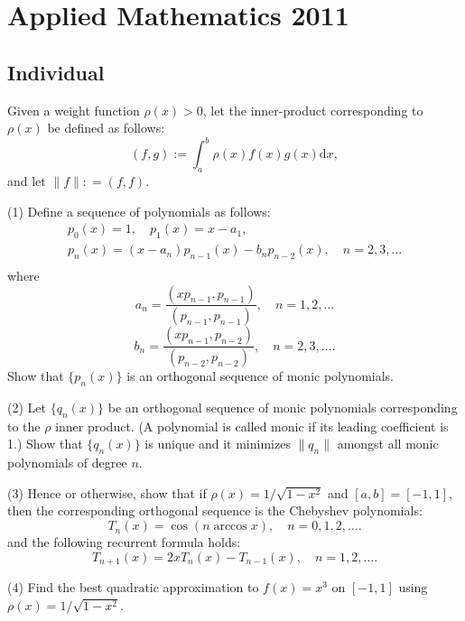 \section{Applied Mathematics 2011}

\subsection{Individual}

\begin{exercise}
\label{applied:2011:1}
Given a weight function $\rho ( x ) > 0$, let the inner-product corresponding to $\rho ( x )$ be defined as follows:
\[
(f, g) := \int_ {a} ^ {b} \rho (x) f (x) g (x) \mathrm {d} x,
\]
and let $\| f \| : = ( f , f )$.

(1) Define a sequence of polynomials as follows:
\[
\begin{array}{l} p _ {0} (x) = 1, \quad p _ {1} (x) = x - a _ {1}, \\ p _ {n} (x) = \left(x - a _ {n}\right) p _ {n - 1} (x) - b _ {n} p _ {n - 2} (x), \quad n = 2, 3, \dots \\ \end{array}
\]
where
\[
a _ {n} = \frac {\left(x p _ {n - 1} , p _ {n - 1}\right)}{\left(p _ {n - 1} , p _ {n - 1}\right)}, \quad n = 1, 2, \dots
\]
\[
b _ {n} = \frac {\left(x p _ {n - 1} , p _ {n - 2}\right)}{\left(p _ {n - 2} , p _ {n - 2}\right)}, \quad n = 2, 3, \dots .
\]
Show that $\{ p _ { n } ( x ) \}$ is an orthogonal sequence of monic polynomials.

(2) Let $\{ q _ { n } ( x ) \}$ be an orthogonal sequence of monic polynomials corresponding to the $\rho$ inner product. (A polynomial is called monic if its leading coefficient is 1.) Show that $\{ q _ { n } ( x ) \}$ is unique and it minimizes $\| q _ { n } \|$ amongst all monic polynomials of degree $n$.

(3) Hence or otherwise, show that if $\rho ( x ) = 1 / \sqrt { 1 - x ^ { 2 } }$ and $[ a , b ] = [ - 1 , 1 ]$, then the corresponding orthogonal sequence is the Chebyshev polynomials:
\[
T _ {n} (x) = \cos (n \arccos x), \quad n = 0, 1, 2, \dots .
\]
and the following recurrent formula holds:
\[
T _ {n + 1} (x) = 2 x T _ {n} (x) - T _ {n - 1} (x), \quad n = 1, 2, \dots .
\]

(4) Find the best quadratic approximation to $f ( x ) = x ^ { 3 }$ on $[ - 1 , 1 ]$ using $\rho ( x ) = 1 / \sqrt { 1 - x ^ { 2 } }$.
\end{exercise}

